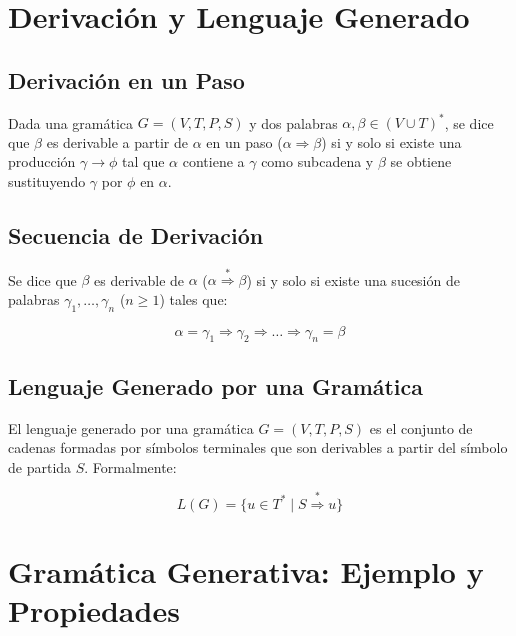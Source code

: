 \documentclass[12pt]{report} %
\begin{document}
\hypertarget{derivaciuxf3n-y-lenguaje-generado}{%
\section{Derivación y Lenguaje
Generado}\label{derivaciuxf3n-y-lenguaje-generado}}

\hypertarget{derivaciuxf3n-en-un-paso}{%
\subsection{Derivación en un Paso}\label{derivaciuxf3n-en-un-paso}}

Dada una gramática \(G = (V, T, P, S)\) y dos palabras
\(\alpha, \beta \in (V \cup T)^*\), se dice que \(\beta\) es derivable a
partir de \(\alpha\) en un paso (\(\alpha \Rightarrow \beta\)) si y solo
si existe una producción \(\gamma \to \phi\) tal que \(\alpha\) contiene
a \(\gamma\) como subcadena y \(\beta\) se obtiene sustituyendo
\(\gamma\) por \(\phi\) en \(\alpha\).

\hypertarget{secuencia-de-derivaciuxf3n}{%
\subsection{Secuencia de Derivación}\label{secuencia-de-derivaciuxf3n}}

Se dice que \(\beta\) es derivable de \(\alpha\)
(\(\alpha \overset{*}{\Rightarrow} \beta\)) si y solo si existe una
sucesión de palabras \(\gamma_1, \ldots, \gamma_n\) (\(n \geq 1\)) tales
que:

\[
\alpha = \gamma_1 \Rightarrow \gamma_2 \Rightarrow \ldots \Rightarrow \gamma_n = \beta
\]

\hypertarget{lenguaje-generado-por-una-gramuxe1tica}{%
\subsection{Lenguaje Generado por una
Gramática}\label{lenguaje-generado-por-una-gramuxe1tica}}

El lenguaje generado por una gramática \(G = (V, T, P, S)\) es el
conjunto de cadenas formadas por símbolos terminales que son derivables
a partir del símbolo de partida \(S\). Formalmente:

\[
L(G) = \{u \in T^* \mid S \overset{*}{\Rightarrow} u\}
\]

\hypertarget{gramuxe1tica-generativa-ejemplo-y-propiedades}{%
\section{Gramática Generativa: Ejemplo y
Propiedades}\label{gramuxe1tica-generativa-ejemplo-y-propiedades}}
\end{document}
